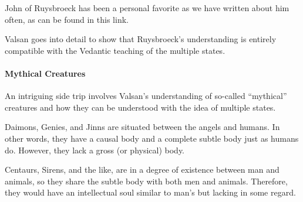 John of Ruysbroeck has been a personal favorite as we have written about him often, as can be found in this link.

Valsan goes into detail to show that Ruysbroeck's understanding is entirely compatible with the Vedantic teaching of the multiple states.

\paragraph{Mythical Creatures}
An intriguing side trip involves Valsan's understanding of so-called “mythical” creatures and how they can be understood with the idea of multiple states.

Daimons, Genies, and Jinns are situated between the angels and humans. In other words, they have a causal body and a complete subtle body just as humans do. However, they lack a gross (or physical) body.

Centaurs, Sirens, and the like, are in a degree of existence between man and animals, so they share the subtle body with both men and animals. Therefore, they would have an intellectual soul similar to man's but lacking in some regard.

